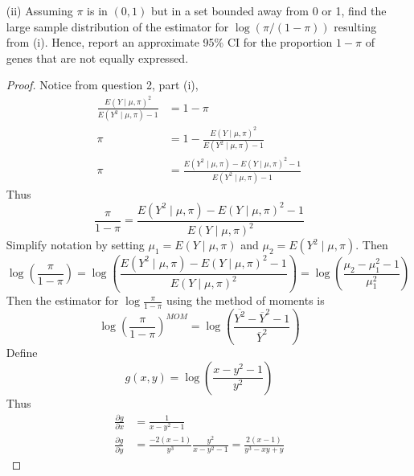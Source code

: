 \documentclass[letterpaper, 12pt]{article}\usepackage[]{graphicx}\usepackage[]{color}
\makeatletter
\newcommand{\hlstd}[1]{\textcolor[rgb]{0.345,0.345,0.345}{#1}}%
\newenvironment{kframe}{%
 \def\at@end@of@kframe{}%
 \ifinner\ifhmode%
  \def\at@end@of@kframe{\end{minipage}}%
  \begin{minipage}{\columnwidth}%
 \fi\fi%
 \def\FrameCommand##1{\hskip\@totalleftmargin \hskip-\fboxsep
 \colorbox{shadecolor}{##1}\hskip-\fboxsep
     \hskip-\linewidth \hskip-\@totalleftmargin \hskip\columnwidth}%
 \MakeFramed {\advance\hsize-\width
   \@totalleftmargin\z@ \linewidth\hsize
   \@setminipage}}%
 {\par\unskip\endMakeFramed%
 \at@end@of@kframe}
\newenvironment{knitrout}{}{} %
\newcommand{\sbs}{\;|\;} %
\makeatother
\begin{document}
\begin{enumerate}
\begin{enumerate}
\begin{proof}
\begin{knitrout}
\begin{kframe}
\begin{alltt}
\hlstd{mu_mom}
\end{alltt}
\begin{verbatim}
## [1] 1.632
\end{verbatim}
\begin{alltt}
\hlstd{one_minus_pi_mom}
\end{alltt}
\begin{verbatim}
## [1] 0.04313
\end{verbatim}
\end{kframe}
\end{knitrout}


Hence the estimators calculated from the method of moments are 
\begin{align*}
\mu^{MOM} &= 1.6317
\quad
\text{and}
\\
(1-\pi)^{MOM} &= 0.0431
\end{align*}
\end{proof}
\item[(ii)]
Assuming $\pi$ is in $(0,1)$ but in a set bounded away from 0 or 1, find the large sample distribution of the estimator for $\log(\pi/(1 - \pi))$ resulting from (i). Hence, report an approximate 95\% CI for the proportion $1-\pi$ of genes that are not equally expressed.
\begin{proof}
Notice from question 2, part (i),
\begin{align*}
\frac{E(Y \sbs \mu, \pi)^2}{E(Y^2 \sbs \mu, \pi) - 1} 
&= 1- \pi \\
\pi &= 1 - \frac{E(Y \sbs \mu, \pi)^2}{E(Y^2 \sbs \mu, \pi) - 1} 
\\
\pi &= \frac{E(Y^2 \mid \mu, \pi) - E(Y \mid \mu, \pi)^2 - 1}{E(Y^2 \sbs \mu, \pi) - 1}
\end{align*}
Thus
\[
\frac{\pi}{1-\pi} 
=
\frac{E(Y^2 \mid \mu, \pi) - E(Y \mid \mu, \pi)^2 - 1}{E(Y \sbs \mu, \pi)^2}
\]
Simplify notation by setting $\mu_1 = E(Y \mid \mu, \pi)$ and $\mu_2 = E(Y^2 \mid \mu, \pi)$. 
Then
\[
\log \left(
\frac{\pi}{1-\pi}
\right)
=
\log
\left(
\frac{E(Y^2 \mid \mu, \pi) - E(Y \mid \mu, \pi)^2 - 1}{E(Y \sbs \mu, \pi)^2}
\right)
=
\log
\left(
\frac{\mu_2 -\mu_1^2 - 1}{\mu_1^2}
\right)
\]
Then the estimator for $\log\frac{\pi}{1-\pi}$ using the method of moments is
\[
\log \left( \frac{\pi}{1-\pi} \right) ^{MOM} =
\log \left(
\frac{\overline{Y^2} - \overline{Y}^2 - 1}{\overline{Y}^2}
\right)
\]
Define 
\[
g(x,y) = \log\left(\frac{x - y^2 - 1}{y^2}\right)
\]
Thus
\begin{align*}
\frac{\partial g}{\partial x} 
&= \frac{1}{x - y^2 - 1}
\\
\frac{\partial g}{\partial y}
&=
\frac{-2(x-1)}{y^3} \frac{y^2}{x - y^2 -1}
=
\frac{2(x-1)}{y^3 - xy +y} 
\end{align*}


\end{proof}
\end{enumerate}
\end{enumerate}
\end{document}
